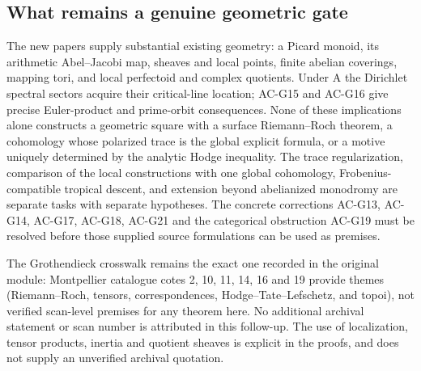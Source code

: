 \subsection{What remains a genuine geometric gate}

The new papers supply substantial existing geometry: a Picard monoid,
its arithmetic Abel--Jacobi map, sheaves and local points, finite
abelian coverings, mapping tori, and local perfectoid and complex
quotients.  Under A the Dirichlet spectral sectors acquire their
critical-line location; AC-G15 and AC-G16 give precise Euler-product
and prime-orbit consequences.  None of these implications alone
constructs a geometric square with a surface Riemann--Roch theorem,
a cohomology whose polarized trace is the global explicit formula, or
a motive uniquely determined by the analytic Hodge inequality.
The trace regularization, comparison of the local constructions with
one global cohomology, Frobenius-compatible tropical descent, and
extension beyond abelianized monodromy are separate tasks with
separate hypotheses.  The concrete corrections AC-G13, AC-G14,
AC-G17, AC-G18, AC-G21 and the categorical obstruction AC-G19 must be resolved
before those supplied source formulations can be used as premises.

The Grothendieck crosswalk remains the exact one recorded in the
original module: Montpellier catalogue cotes 2, 10, 11, 14, 16 and 19
provide themes (Riemann--Roch, tensors, correspondences,
Hodge--Tate--Lefschetz, and topoi), not verified scan-level premises
for any theorem here.  No additional archival statement or scan
number is attributed in this follow-up.  The use of localization,
tensor products, inertia and quotient sheaves is explicit in the
proofs, and does not supply an unverified archival quotation.
